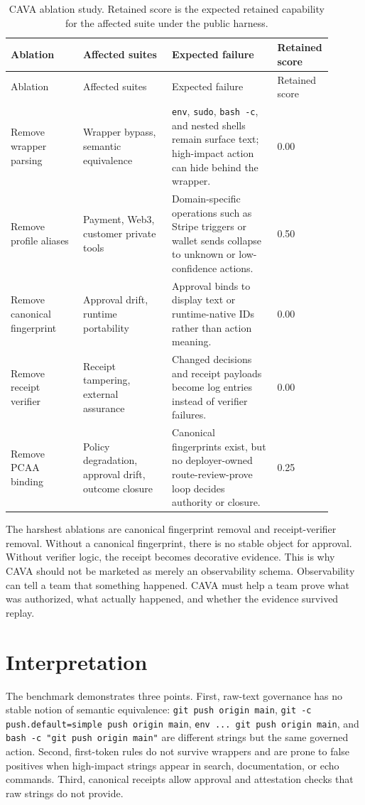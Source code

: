 \documentclass[11pt]{article}
\begin{document}
\begin{longtable}{@{}L{0.22\linewidth}L{0.27\linewidth}L{0.32\linewidth}L{0.09\linewidth}@{}}
\caption{CAVA ablation study. Retained score is the expected retained capability for the affected suite under the public harness.}
\label{tab:ablation-study}\\
\toprule
Ablation & Affected suites & Expected failure & Retained score \\
\midrule
\endfirsthead
\toprule
Ablation & Affected suites & Expected failure & Retained score \\
\midrule
\endhead
Remove wrapper parsing & Wrapper bypass, semantic equivalence & \texttt{env}, \texttt{sudo}, \texttt{bash -c}, and nested shells remain surface text; high-impact action can hide behind the wrapper. & 0.00 \\
Remove profile aliases & Payment, Web3, customer private tools & Domain-specific operations such as Stripe triggers or wallet sends collapse to unknown or low-confidence actions. & 0.50 \\
Remove canonical fingerprint & Approval drift, runtime portability & Approval binds to display text or runtime-native IDs rather than action meaning. & 0.00 \\
Remove receipt verifier & Receipt tampering, external assurance & Changed decisions and receipt payloads become log entries instead of verifier failures. & 0.00 \\
Remove PCAA binding & Policy degradation, approval drift, outcome closure & Canonical fingerprints exist, but no deployer-owned route-review-prove loop decides authority or closure. & 0.25 \\
\bottomrule
\end{longtable}

The harshest ablations are canonical fingerprint removal and receipt-verifier removal. Without a canonical fingerprint, there is no stable object for approval. Without verifier logic, the receipt becomes decorative evidence. This is why CAVA should not be marketed as merely an observability schema. Observability can tell a team that something happened. CAVA must help a team prove what was authorized, what actually happened, and whether the evidence survived replay.

\section{Interpretation}

The benchmark demonstrates three points. First, raw-text governance has no stable notion of semantic equivalence: \texttt{git push origin main}, \texttt{git -c push.default=simple push origin main}, \texttt{env ... git push origin main}, and \texttt{bash -c "git push origin main"} are different strings but the same governed action. Second, first-token rules do not survive wrappers and are prone to false positives when high-impact strings appear in search, documentation, or echo commands. Third, canonical receipts allow approval and attestation checks that raw strings do not provide.
\end{document}
